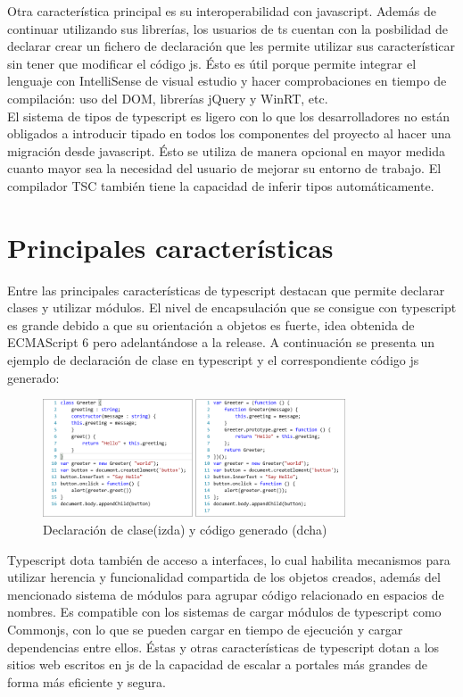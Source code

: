 \documentclass[12pt,twoside,a4paper, spanish]{article}
\begin{document}
	Otra característica principal es su interoperabilidad con javascript. Además de continuar utilizando sus librerías, los usuarios de ts cuentan con la posbilidad de declarar crear un fichero de declaración que les permite utilizar sus característicar sin tener que modificar el código js. Ésto es útil porque permite integrar el lenguaje con IntelliSense de visual estudio y hacer comprobaciones en tiempo de compilación: uso del DOM, librerías jQuery y WinRT, etc. \\
	
	El sistema de tipos de typescript es ligero con lo que los desarrolladores no están obligados a introducir tipado en todos los componentes del proyecto al hacer una migración desde javascript. Ésto se utiliza de manera opcional en mayor medida cuanto mayor sea la necesidad del usuario de mejorar su entorno de trabajo. El compilador TSC también tiene la capacidad de inferir tipos automáticamente.
    
    \section{Principales características}
    
    Entre las principales características de typescript destacan que permite declarar clases y utilizar módulos. El nivel de encapsulación que se consigue con typescript es grande debido a que su orientación a objetos es fuerte, idea obtenida de ECMAScript 6 pero adelantándose a la release. A continuación se presenta un ejemplo de declaración de clase en typescript y el correspondiente código js generado:
    
    \begin{figure}[h]
    	\centering
    	\includegraphics[width=0.8\textwidth]{imagenes/ts7.png}
    	\caption{Declaración de clase(izda) y código generado (dcha)}
    \end{figure}

	Typescript dota también de acceso a interfaces, lo cual habilita mecanismos para utilizar herencia y funcionalidad compartida de los objetos creados, además del mencionado sistema de módulos para agrupar código relacionado en espacios de nombres. Es compatible con los sistemas de cargar módulos de typescript como Commonjs, con lo que se pueden cargar en tiempo de ejecución y cargar dependencias entre ellos. Éstas y otras características de typescript dotan a los sitios web escritos en js de la capacidad de escalar a portales más grandes de forma más eficiente y segura.
    
\end{document}

